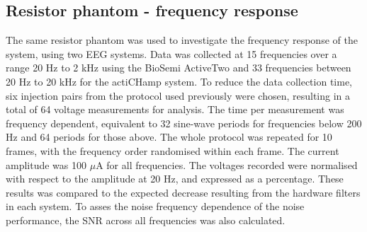 \subsection{Resistor phantom - frequency response}
\label{MethodsRPFreq}
The same resistor phantom was used to investigate the frequency response of the system, using two EEG systems. Data was collected at 15 frequencies over a range 20 Hz to 2 kHz using the BioSemi ActiveTwo and 33 frequencies between 20 Hz to 20 kHz for the actiCHamp system. To reduce the data collection time, six injection pairs from the protocol used previously were chosen, resulting in a total of 64 voltage measurements for analysis. The time per measurement was frequency dependent, equivalent to 32 sine-wave periods for frequencies below 200 Hz and 64 periods for those above. The whole protocol was repeated for 10 frames, with the frequency order randomised within each frame. The current amplitude was 100 $\mu$A for all frequencies. The voltages recorded were normalised with respect to the amplitude at 20 Hz, and expressed as a percentage. These results was compared to the expected decrease resulting from the hardware filters in each system. To asses the noise frequency dependence of the noise performance, the SNR across all frequencies was also calculated.  


